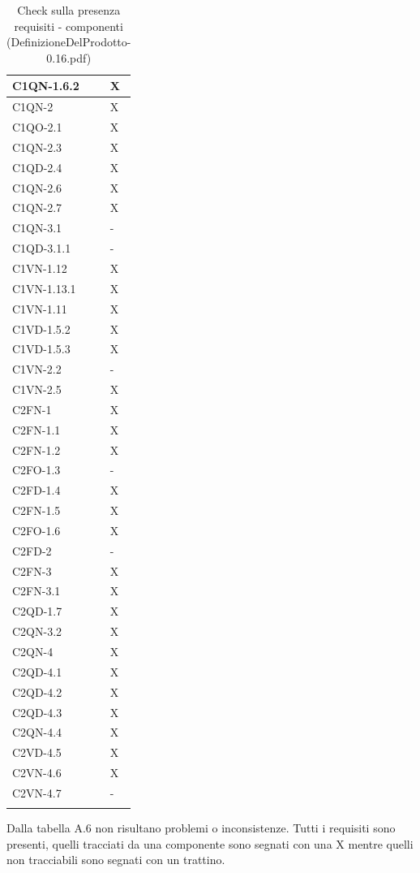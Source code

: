 \begin{footnotesize}
\begin{longtable}{|p{}|p{}|}
 C1QN-1.6.2&X   \\ \hline
 C1QN-2&X \\ \hline
 C1QO-2.1&X \\ \hline
 C1QN-2.3&X  \\ \hline
 C1QD-2.4&X  \\ \hline
 C1QN-2.6&X  \\ \hline
 C1QN-2.7&X    \\ \hline
 C1QN-3.1&-   \\ \hline
 C1QD-3.1.1&-    \\ \hline
 C1VN-1.12&X \\ \hline
 C1VN-1.13.1&X  \\ \hline
 C1VN-1.11&X  \\ \hline
 C1VD-1.5.2&X \\ \hline
 C1VD-1.5.3&X   \\ \hline
 C1VN-2.2&- \\ \hline
 C1VN-2.5&X  \\ \hline
 C2FN-1&X    \\ \hline
 C2FN-1.1&X    \\ \hline
 C2FN-1.2&X   \\ \hline
 C2FO-1.3&-    \\ \hline
 C2FD-1.4&X   \\ \hline
 C2FN-1.5&X   \\ \hline
 C2FO-1.6&X   \\ \hline
 C2FD-2&-    \\ \hline
 C2FN-3&X   \\ \hline
 C2FN-3.1&X   \\ \hline
 C2QD-1.7&X   \\ \hline
 C2QN-3.2&X   \\ \hline
 C2QN-4 &X  \\ \hline
 C2QD-4.1&X    \\ \hline
 C2QD-4.2&X   \\ \hline
 C2QD-4.3&X   \\ \hline
 C2QN-4.4&X  \\ \hline
 C2VD-4.5&X   \\ \hline
 C2VN-4.6&X    \\ \hline
 C2VN-4.7&-  \\ \hline

\caption{Check sulla presenza requisiti - componenti
(DefinizioneDelProdotto-0.16.pdf)}
\end{longtable}
\end{footnotesize}

Dalla tabella A.6 non risultano problemi o inconsistenze. Tutti i requisiti sono
presenti, quelli tracciati da una componente sono segnati con una X mentre
quelli non tracciabili sono segnati con un trattino.

